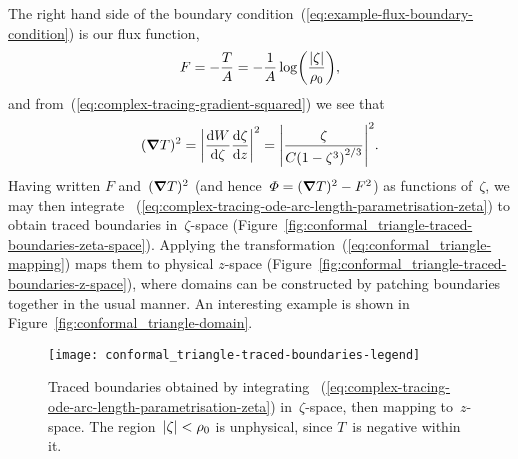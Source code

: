 \begin{figure}
\end{figure}

The right hand side
of the boundary condition~(\ref{eq:example-flux-boundary-condition})
is our flux function,
\begin{equation}
  F = -\frac{T}{A} = -\frac{1}{A} \log \roundbr*{\frac{\abs{\zeta}}{\rho_0}},
  \label{eq:conformal_triangle-flux-function}
\end{equation}
and from~(\ref{eq:complex-tracing-gradient-squared})
we see that
\begin{equation}
  (\del T)^2
    = \abs*{\tder{W}{\zeta} \tder{\zeta}{z}}^2
    = \abs*{\frac{\zeta}{C \roundbr*{1 - \zeta^3}^{2/3}}}^2.
  \label{eq:conformal_triangle-gradient-squared}
\end{equation}
Having written $F$ and~$(\mathop{}\!\boldsymbol{\mathbf{\nabla}} T)^2$
(and hence~$\varPhi = (\mathop{}\!\boldsymbol{\mathbf{\nabla}} T)^2 - F^2$)
as functions of~$\zeta$,
we may then integrate~%
  (\ref{eq:complex-tracing-ode-arc-length-parametrisation-zeta})
to obtain traced boundaries in~$\zeta$-space
(Figure~\ref{fig:conformal_triangle-traced-boundaries-zeta-space}).
Applying the transformation~(\ref{eq:conformal_triangle-mapping})
maps them to physical $z$-space
(Figure~\ref{fig:conformal_triangle-traced-boundaries-z-space}),
where domains can be constructed
by patching boundaries together in the usual manner.
An interesting example is shown in Figure~\ref{fig:conformal_triangle-domain}.

\begin{figure}
  \newcommand*{\subfigurewidth}{0.47\textwidth}
  \texttt{[image: conformal\_triangle-traced-boundaries-legend]}
  \begin{subfigure}[t]{\subfigurewidth}
  \end{subfigure}
    \hfill
  \begin{subfigure}[t]{\subfigurewidth}
  \end{subfigure}
  \caption{
    Traced boundaries obtained by integrating~%
      (\ref{eq:complex-tracing-ode-arc-length-parametrisation-zeta})
    in~$\zeta$-space,
    then mapping to~$z$-space.
    The region~$\lvert\zeta\rvert < \rho_0$ is unphysical,
    since $T$~is negative within it.
  }
  \label{fig:conformal_triangle-traced-boundaries}
\end{figure}

\begin{figure}
\end{figure}
